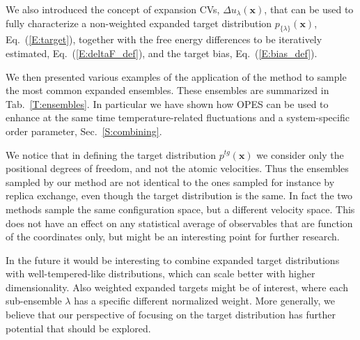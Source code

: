 \documentclass[aps,prx,reprint,superscriptaddress]{revtex4-1} %
\begin{document}
We also introduced the concept of expansion CVs, $\Delta u_\lambda(\mathbf{x})$, that can be used to fully characterize a non-weighted expanded target distribution $p_{\{\lambda\}}(\mathbf{x})$, Eq.~(\ref{E:target}), together with the free energy differences to be iteratively estimated, Eq.~(\ref{E:deltaF_def}), and the target bias, Eq.~(\ref{E:bias_def}).

We then presented various examples of the application of the method to sample the most common expanded ensembles.
These ensembles are summarized in Tab.~\ref{T:ensembles}.
In particular we have shown how OPES can be used to enhance at the same time temperature-related fluctuations and a system-specific order parameter, Sec.~\ref{S:combining}.

We notice that in defining the target distribution $p^{tg}(\mathbf{x})$ we consider only the positional degrees of freedom, and not the atomic velocities.
Thus the ensembles sampled by our method are not identical to the ones sampled for instance by replica exchange, even though the target distribution is the same.
In fact the two methods sample the same configuration space, but a different velocity space.
This does not have an effect on any statistical average of observables that are function of the coordinates only, but might be an interesting point for further research.

In the future it would be interesting to combine expanded target distributions with well-tempered-like distributions, which can scale better with higher dimensionality.
Also weighted expanded targets might be of interest, where each sub-ensemble $\lambda$ has a specific different normalized weight.
More generally, we believe that our perspective of focusing on the target distribution has further potential that should be explored.
\end{document}
